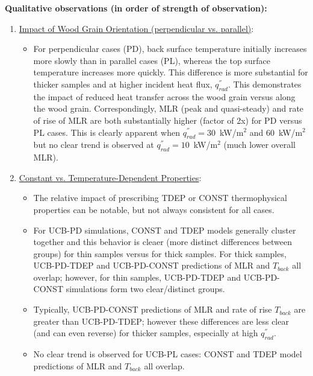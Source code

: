\documentclass{article}
\begin{document}
\textbf{Qualitative observations (in order of strength of observation):}
\begin{enumerate}[]
	\item \underline{Impact of Wood Grain Orientation (perpendicular vs. parallel)}: 
	\begin{itemize} 
		\item For perpendicular cases (PD), back surface temperature initially increases more slowly than in parallel cases (PL), whereas the top surface temperature increases more quickly. This difference is more substantial for thicker samples and at higher incident heat flux, $q^{''}_{rad}$. This demonstrates the impact of reduced heat transfer across the wood grain versus along the wood grain. Correspondingly, MLR (peak and quasi-steady) and rate of rise of MLR are both substantially higher (factor of 2x) for PD versus PL cases. This is clearly apparent  when $q^{''}_{rad}=30$~kW/m$^2$ and 60~kW/m$^2$ but no clear trend is observed at $q^{''}_{rad}=10$~kW/m$^2$ (much lower overall MLR). 
	\end{itemize}
	
	\item \underline{Constant vs. Temperature-Dependent Properties}: 
	\begin{itemize}
		\item The relative impact of prescribing TDEP or CONST thermophysical properties can be notable, but not always consistent for all cases. 
		\item For UCB-PD simulations, CONST and TDEP models generally cluster together and this behavior is cleaer (more distinct differences between groups) for thin samples versus for thick samples. For thick samples, UCB-PD-TDEP and UCB-PD-CONST predictions of MLR and $T_{back}$ all overlap; however, for thin samples, UCB-PD-TDEP and UCB-PD-CONST simulations form two clear/distinct groups.
		\item Typically, UCB-PD-CONST predictions of MLR and rate of rise $T_{back}$ are greater than UCB-PD-TDEP; however these differences are less clear (and can even reverse) for thicker samples, especially at high $q^{''}_{rad}$. 
		\item No clear trend is observed for UCB-PL cases: CONST and TDEP model predictions of MLR and $T_{back}$ all overlap.  
	\end{itemize}
	

\end{enumerate}
\end{document}
